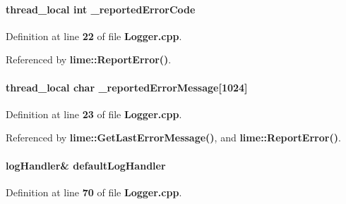 \paragraph[{\+\_\+reported\+Error\+Code}]{\setlength{\rightskip}{0pt plus 5cm}thread\+\_\+local {\bf int} \+\_\+reported\+Error\+Code}\label{limesuite-dev_2src_2Logger_8cpp_a293345e7ee6195fa82f19f439faea68a}


Definition at line {\bf 22} of file {\bf Logger.\+cpp}.



Referenced by {\bf lime\+::\+Report\+Error()}.

\paragraph[{\+\_\+reported\+Error\+Message}]{\setlength{\rightskip}{0pt plus 5cm}thread\+\_\+local char \+\_\+reported\+Error\+Message[1024]}\label{limesuite-dev_2src_2Logger_8cpp_afa8ace06f8ece4a3d334d9cd2dbbdd14}


Definition at line {\bf 23} of file {\bf Logger.\+cpp}.



Referenced by {\bf lime\+::\+Get\+Last\+Error\+Message()}, and {\bf lime\+::\+Report\+Error()}.

\paragraph[{default\+Log\+Handler}]{ log\+Handler\& default\+Log\+Handler\hspace{0.3cm}{\ttfamily [static]}}\label{limesuite-dev_2src_2Logger_8cpp_af010d84d59c16d229a91e2e1c18f66f1}


Definition at line {\bf 70} of file {\bf Logger.\+cpp}.


